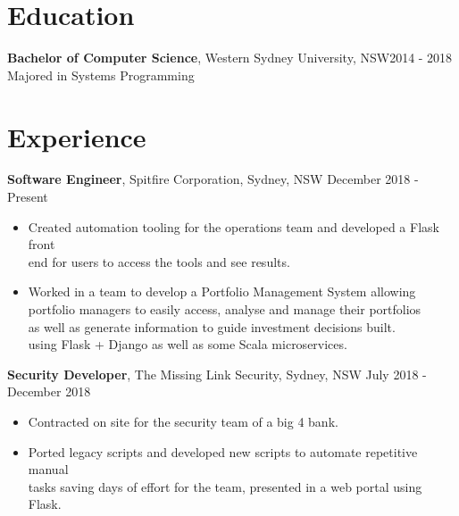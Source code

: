 \documentclass[margin]{res}
\begin{document}

\address{{\bf Present Address} \\ 26/23-25 John Street\\ Lidcombe, NSW 2141  \\
        +61414329597 }
\address{{\bf Email Address} \\ ben.hili1994@gmail.com }


\begin{resume}

\section{Education}
	{\bf Bachelor of Computer Science}, Western Sydney University, NSW\hfill 2014 - 2018\\ 
	Majored in Systems Programming

\section{Experience}
{\bf Software Engineer}, 
	Spitfire Corporation, Sydney, NSW \hfill December 2018 - Present
\begin{itemize} \itemsep 0pt  %
\item Created automation tooling for the operations team and developed a Flask front \\
	end for users to access the tools and see results.

\item Worked in a team to develop a Portfolio Management System allowing \\
	portfolio managers to easily access, analyse and manage their portfolios \\
		as well as generate information to guide investment decisions built. \\
		using Flask + Django as well as some Scala microservices.
	
\end{itemize}

{\bf Security Developer}, 
	The Missing Link Security, Sydney, NSW \hfill July 2018 - December 2018
\begin{itemize} \itemsep 0pt  %
\item Contracted on site for the security team of a big 4 bank.

\item Ported legacy scripts and developed new scripts to automate repetitive manual \\
	tasks saving days of effort for the team, presented in a web portal using Flask. 


\end{itemize}
\end{resume}
\end{document}
